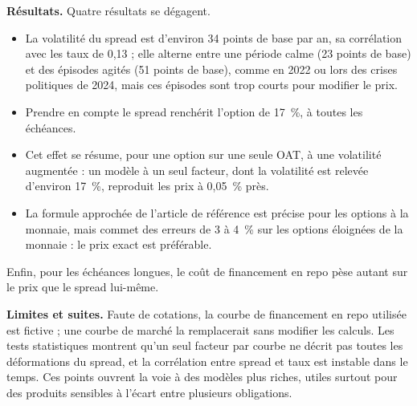 \textbf{Résultats.} Quatre résultats se dégagent.
\begin{itemize}
\item La volatilité du spread est d'environ 34 points de base par an, sa corrélation avec les taux de 0,13 ;
elle alterne entre une période calme (23 points de base) et des épisodes agités (51 points de base), comme
en 2022 ou lors des crises politiques de 2024, mais ces épisodes sont trop courts pour modifier le prix.
\item Prendre en compte le spread renchérit l'option de 17~\%, à toutes les échéances.
\item Cet effet se résume, pour une option sur une seule OAT, à une volatilité augmentée : un modèle à un seul
facteur, dont la volatilité est relevée d'environ 17~\%, reproduit les prix à 0,05~\% près.
\item La formule approchée de l'article de référence est précise pour les options à la monnaie, mais commet des
erreurs de 3 à 4~\% sur les options éloignées de la monnaie : le prix exact est préférable.
\end{itemize}
Enfin, pour les échéances longues, le coût de financement en repo pèse autant sur le prix que le spread lui-même.

\textbf{Limites et suites.} Faute de cotations, la courbe de financement en repo utilisée est fictive ; une courbe
de marché la remplacerait sans modifier les calculs. Les tests statistiques montrent qu'un seul facteur par courbe
ne décrit pas toutes les déformations du spread, et la corrélation entre spread et taux est instable dans le
temps. Ces points ouvrent la voie à des modèles plus riches, utiles surtout pour des produits sensibles à l'écart
entre plusieurs obligations.
